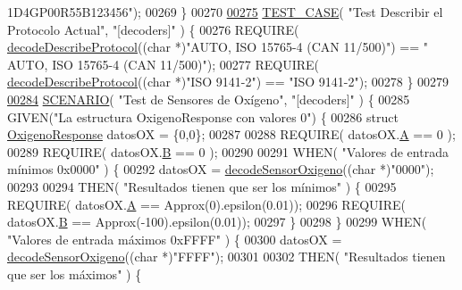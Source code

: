 \begin{DoxyCode}
{{      1D4GP00R55B123456"});
00269 \}
00270 
\hyperlink{UnitTestCase_8cpp_ada6898123ac1c26cdb74330eea16b825}{00275} \hyperlink{UnitTestCase_8cpp_a094ceea8956a9b495823bde621ea759a}{TEST\_CASE}( \textcolor{stringliteral}{"Test Describir el Protocolo Actual"}, \textcolor{stringliteral}{"[decoders]"} ) \{
00276     REQUIRE( \hyperlink{decoders_8cpp_ab83ce79cd098ea655f3812488e304a0c}{decodeDescribeProtocol}((\textcolor{keywordtype}{char} *)\textcolor{stringliteral}{"AUTO, ISO 15765-4 (CAN 11/500)"}) == \textcolor{stringliteral}{"
      AUTO, ISO 15765-4 (CAN 11/500)"});
00277     REQUIRE( \hyperlink{decoders_8cpp_ab83ce79cd098ea655f3812488e304a0c}{decodeDescribeProtocol}((\textcolor{keywordtype}{char} *)\textcolor{stringliteral}{"ISO 9141-2"}) == \textcolor{stringliteral}{"ISO 9141-2"});
00278 \}
00279 
\hyperlink{UnitTestCase_8cpp_aa6afb62ebdd4c3e07996c995f623eb6b}{00284} \hyperlink{UnitTestCase_8cpp_aa6afb62ebdd4c3e07996c995f623eb6b}{SCENARIO}( \textcolor{stringliteral}{"Test de Sensores de Oxígeno"}, \textcolor{stringliteral}{"[decoders]"} ) \{
00285     GIVEN(\textcolor{stringliteral}{"La estructura OxigenoResponse con valores 0"}) \{
00286         \textcolor{keyword}{struct }\hyperlink{structOxigenoResponse}{OxigenoResponse} datosOX = \{0,0\};
00287 
00288         REQUIRE( datosOX.\hyperlink{structOxigenoResponse_a068c403e5746226cf22bb020b4c786d3}{A} == 0 );
00289         REQUIRE( datosOX.\hyperlink{structOxigenoResponse_a96b19152dd001e19d1351e2d97f22736}{B} == 0 );
00290 
00291         WHEN( \textcolor{stringliteral}{"Valores de entrada mínimos 0x0000"} ) \{
00292             datosOX = \hyperlink{decoders_8cpp_a5b53fc5fc37fbee9c5e389f6c8c18438}{decodeSensorOxigeno}((\textcolor{keywordtype}{char} *)\textcolor{stringliteral}{"0000"});
00293 
00294             THEN( \textcolor{stringliteral}{"Resultados tienen que ser los mínimos"} ) \{
00295                 REQUIRE( datosOX.\hyperlink{structOxigenoResponse_a068c403e5746226cf22bb020b4c786d3}{A} == Approx(0).epsilon(0.01));
00296                 REQUIRE( datosOX.\hyperlink{structOxigenoResponse_a96b19152dd001e19d1351e2d97f22736}{B} == Approx(-100).epsilon(0.01));
00297             \}
00298         \}
00299         WHEN( \textcolor{stringliteral}{"Valores de entrada máximos 0xFFFF"} ) \{
00300             datosOX = \hyperlink{decoders_8cpp_a5b53fc5fc37fbee9c5e389f6c8c18438}{decodeSensorOxigeno}((\textcolor{keywordtype}{char} *)\textcolor{stringliteral}{"FFFF"});
00301 
00302             THEN( \textcolor{stringliteral}{"Resultados tienen que ser los máximos"} ) \{
}
\end{DoxyCode}
